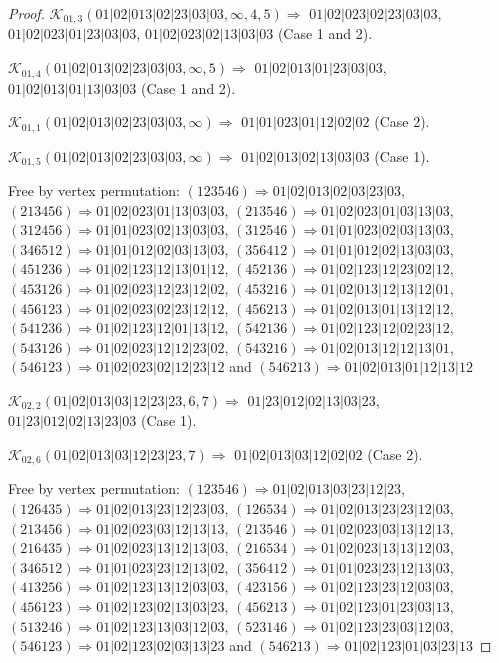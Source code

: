 \documentclass[12pt]{article}
\theoremstyle{plain}
\theoremstyle{definition}
\theoremstyle{remark}
\newcommand{\fancy}[1]{\mathcal{#1}}
\def\K{\fancy{K}}
\begin{document}
\begin{proof}
	
	
	\bigskip
	
	$\K_{01,3}(01|02|013|02|23|03|03,\infty,4, 5)\Rightarrow $ $01|02|023|02|23|03|03$, $01|02|023|01|23|03|03$, $01|02|023|02|13|03|03$ (Case 1 and 2).
	
	$\K_{01,4}(01|02|013|02|23|03|03,\infty,5)\Rightarrow $ $01|02|013|01|23|03|03$, $01|02|013|01|13|03|03$ (Case 1 and 2).
	
	$\K_{01,1}(01|02|013|02|23|03|03,\infty)\Rightarrow $ $01|01|023|01|12|02|02$ (Case 2).
	
	$\K_{01,5}(01|02|013|02|23|03|03,\infty)\Rightarrow $ $01|02|013|02|13|03|03$ (Case 1).
	
	
	
	Free by vertex permutation: $(1 2 3 5 4 6)\Rightarrow 01|02|013|02|03|23|03$, $(2 1 3 4 5 6)\Rightarrow 01|02|023|01|13|03|03$, $(2 1 3 5 4 6)\Rightarrow 01|02|023|01|03|13|03$, $(3 1 2 4 5 6)\Rightarrow 01|01|023|02|13|03|03$, $(3 1 2 5 4 6)\Rightarrow 01|01|023|02|03|13|03$, $(3 4 6 5 1 2)\Rightarrow 01|01|012|02|03|13|03$, $(3 5 6 4 1 2)\Rightarrow 01|01|012|02|13|03|03$, $(4 5 1 2 3 6)\Rightarrow 01|02|123|12|13|01|12$, $(4 5 2 1 3 6)\Rightarrow 01|02|123|12|23|02|12$, $(4 5 3 1 2 6)\Rightarrow 01|02|023|12|23|12|02$, $(4 5 3 2 1 6)\Rightarrow 01|02|013|12|13|12|01$, $(4 5 6 1 2 3)\Rightarrow 01|02|023|02|23|12|12$, $(4 5 6 2 1 3)\Rightarrow 01|02|013|01|13|12|12$, $(5 4 1 2 3 6)\Rightarrow 01|02|123|12|01|13|12$, $(5 4 2 1 3 6)\Rightarrow 01|02|123|12|02|23|12$, $(5 4 3 1 2 6)\Rightarrow 01|02|023|12|12|23|02$, $(5 4 3 2 1 6)\Rightarrow 01|02|013|12|12|13|01$, $(5 4 6 1 2 3)\Rightarrow 01|02|023|02|12|23|12$ and $(5 4 6 2 1 3)\Rightarrow 01|02|013|01|12|13|12$
	
	
	
	\bigskip
	
	$\K_{02,2}(01|02|013|03|12|23|23,6, 7)\Rightarrow $ $01|23|012|02|13|03|23$, $01|23|012|02|13|23|03$ (Case 1).
	
	$\K_{02,6}(01|02|013|03|12|23|23,7)\Rightarrow $ $01|02|013|03|12|02|02$ (Case 2).
	
	
	
	Free by vertex permutation: $(1 2 3 5 4 6)\Rightarrow 01|02|013|03|23|12|23$, $(1 2 6 4 3 5)\Rightarrow 01|02|013|23|12|23|03$, $(1 2 6 5 3 4)\Rightarrow 01|02|013|23|23|12|03$, $(2 1 3 4 5 6)\Rightarrow 01|02|023|03|12|13|13$, $(2 1 3 5 4 6)\Rightarrow 01|02|023|03|13|12|13$, $(2 1 6 4 3 5)\Rightarrow 01|02|023|13|12|13|03$, $(2 1 6 5 3 4)\Rightarrow 01|02|023|13|13|12|03$, $(3 4 6 5 1 2)\Rightarrow 01|01|023|23|12|13|02$, $(3 5 6 4 1 2)\Rightarrow 01|01|023|23|12|13|03$, $(4 1 3 2 5 6)\Rightarrow 01|02|123|13|12|03|03$, $(4 2 3 1 5 6)\Rightarrow 01|02|123|23|12|03|03$, $(4 5 6 1 2 3)\Rightarrow 01|02|123|02|13|03|23$, $(4 5 6 2 1 3)\Rightarrow 01|02|123|01|23|03|13$, $(5 1 3 2 4 6)\Rightarrow 01|02|123|13|03|12|03$, $(5 2 3 1 4 6)\Rightarrow 01|02|123|23|03|12|03$, $(5 4 6 1 2 3)\Rightarrow 01|02|123|02|03|13|23$ and $(5 4 6 2 1 3)\Rightarrow 01|02|123|01|03|23|13$
	

\end{proof}
\end{document}

